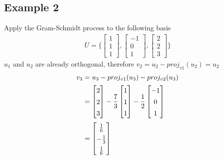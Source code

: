 \documentclass{article}
\theoremstyle{mytheoremstyle}
\theoremstyle{mytheoremstyle}
\theoremstyle{myproblemstyle}
\begin{document}
    \subsection*{Example 2}
    Apply the Gram-Schmidt process to the following basis
    \begin{align*}
        U = \Bigg\{
            \begin{bmatrix}
                1 \\ 1 \\ 1
            \end{bmatrix},
            \begin{bmatrix}
                -1 \\ 0 \\ 1
            \end{bmatrix},
            \begin{bmatrix}
                2 \\ 2 \\ 3
            \end{bmatrix}
        \Bigg\}
    \end{align*}
    $u_1$ and $u_2$ are already orthogonal, therefore $v_2 = u_2-proj_{v1}(u_2) = u_2$
    \begin{align*}
        v_3 &= u_3 - proj_{v1}(u_3) - proj_{v2}(u_3) \\
            &=
            \begin{bmatrix}
                2 \\ 2 \\ 3
            \end{bmatrix} - \frac{7}{3} \begin{bmatrix}
                1 \\ 1 \\ 1
            \end{bmatrix} - \frac{1}{2} \begin{bmatrix}
                -1 \\ 0 \\ 1
            \end{bmatrix} \\
            &= \renewcommand{\arraystretch}{1.4}\begin{bmatrix}
                \frac{1}{6} \\ -\frac{1}{3} \\ \frac{1}{6}
            \end{bmatrix}
    \end{align*}
\end{document}
